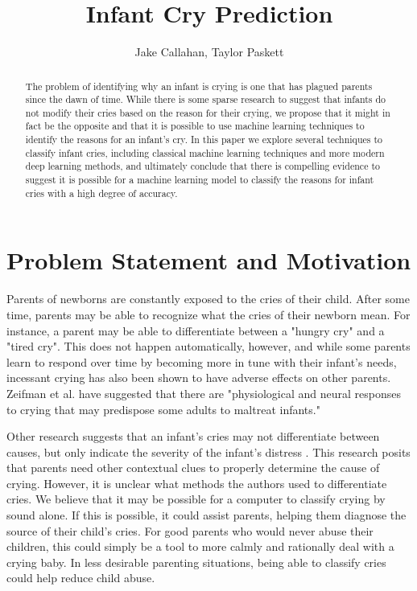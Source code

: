 \documentclass[11pt]{article}
\title{Infant Cry Prediction}
\author{Jake Callahan, Taylor Paskett}
\begin{document}
\maketitle

\begin{abstract}
   The problem of identifying why an infant is crying is one that has plagued parents since the dawn of time.
   While there is some sparse research to suggest that infants do not modify their cries based on the reason for their crying, we propose that it might in fact be the opposite and that it is possible to use machine learning techniques to identify the reasons for an infant's cry.
   In this paper we explore several techniques to classify infant cries, including classical machine learning techniques and more modern deep learning methods, and ultimately conclude that there is compelling evidence to suggest it is possible for a machine learning model to classify the reasons for infant cries with a high degree of accuracy.
\end{abstract}

\section{Problem Statement and Motivation}
Parents of newborns are constantly exposed to the cries of their child.
After some time, parents may be able to recognize what the cries of their newborn mean.
For instance, a parent may be able to differentiate between a "hungry cry" and a "tired cry".
This does not happen automatically, however, and while some parents learn to respond over time by becoming more in tune with their infant's needs, incessant crying has also been shown to have adverse effects on other parents.
Zeifman et al. have suggested that there are "physiological and neural responses to crying that may predispose some adults to maltreat infants." \cite{infant_maltreat} %

Other research suggests that an infant's cries may not differentiate between causes, but only indicate the severity of the infant's distress \cite{can_classify}.
This research posits that parents need other contextual clues to properly determine the cause of crying.
However, it is unclear what methods the authors used to differentiate cries.
We believe that it may be possible for a computer to classify crying by sound alone.
If this is possible, it could assist parents, helping them diagnose the source of their child's cries.
For good parents who would never abuse their children, this could simply be a tool to more calmly and rationally deal with a crying baby.
In less desirable parenting situations, being able to classify cries could help reduce child abuse.
\end{document}
